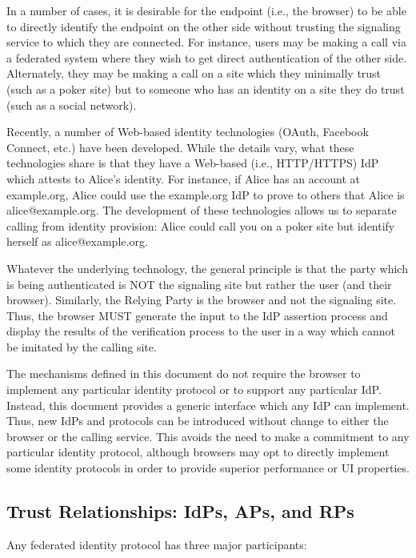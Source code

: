 \documentclass{article}
\begin{document}
In a number of cases, it is desirable for the endpoint (i.e., the
browser) to be able to directly identify the endpoint on the other
side without trusting the signaling service to which they are
connected.  For instance, users may be making a call via a federated
system where they wish to get direct authentication of the other
side.  Alternately, they may be making a call on a site which they
minimally trust (such as a poker site) but to someone who has an
identity on a site they do trust (such as a social network).

Recently, a number of Web-based identity technologies (OAuth,
Facebook Connect, etc.) have been developed.  While the details vary,
what these technologies share is that they have a Web-based (i.e.,
HTTP/HTTPS) IdP which attests to Alice's identity.  For instance, if
Alice has an account at example.org, Alice could use the example.org
IdP to prove to others that Alice is alice@example.org.  The
development of these technologies allows us to separate calling from
identity provision: Alice could call you on a poker site but identify
herself as alice@example.org.

Whatever the underlying technology, the general principle is that the
party which is being authenticated is NOT the signaling site but
rather the user (and their browser).  Similarly, the Relying Party is
the browser and not the signaling site.  Thus, the browser MUST
generate the input to the IdP assertion process and display the
results of the verification process to the user in a way which cannot
be imitated by the calling site.

The mechanisms defined in this document do not require the browser to
implement any particular identity protocol or to support any
particular IdP.  Instead, this document provides a generic interface
which any IdP can implement.  Thus, new IdPs and protocols can be
introduced without change to either the browser or the calling
service.  This avoids the need to make a commitment to any particular
identity protocol, although browsers may opt to directly implement
some identity protocols in order to provide superior performance or
UI properties.

\subsection{Trust Relationships: IdPs, APs, and RPs}
\label{sec:trust-relationships}

Any federated identity protocol has three major participants:
\end{document}
